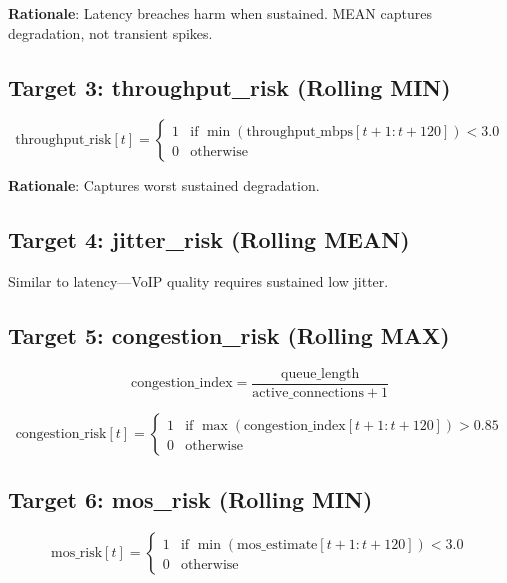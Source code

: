 \documentclass[11pt,a4paper,oneside]{report}
\begin{document}
\textbf{Rationale}: Latency breaches harm when sustained. MEAN captures degradation, not transient spikes.

\subsection{Target 3: throughput\_risk (Rolling MIN)}

\begin{equation*}
\text{throughput\_risk}[t] = \begin{cases}
1 & \text{if } \min(\text{throughput\_mbps}[t+1:t+120]) < 3.0 \\
0 & \text{otherwise}
\end{cases}
\end{equation*}

\textbf{Rationale}: Captures worst sustained degradation.

\subsection{Target 4: jitter\_risk (Rolling MEAN)}

Similar to latency---VoIP quality requires sustained low jitter.

\subsection{Target 5: congestion\_risk (Rolling MAX)}

\begin{equation*}
\text{congestion\_index} = \frac{\text{queue\_length}}{\text{active\_connections} + 1}
\end{equation*}

\begin{equation*}
\text{congestion\_risk}[t] = \begin{cases}
1 & \text{if } \max(\text{congestion\_index}[t+1:t+120]) > 0.85 \\
0 & \text{otherwise}
\end{cases}
\end{equation*}

\subsection{Target 6: mos\_risk (Rolling MIN)}

\begin{equation*}
\text{mos\_risk}[t] = \begin{cases}
1 & \text{if } \min(\text{mos\_estimate}[t+1:t+120]) < 3.0 \\
0 & \text{otherwise}
\end{cases}
\end{equation*}
\end{document}
